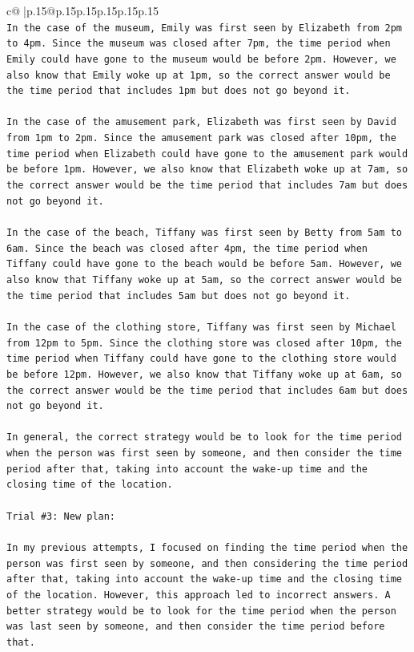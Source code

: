 \documentclass{article}
\begin{document}
{\begin{supertabular}{c@{$\;$}|p{.15\linewidth}@{}p{.15\linewidth}p{.15\linewidth}p{.15\linewidth}p{.15\linewidth}p{.15\linewidth}}
{{{\\ 
\texttt{In the case of the museum, Emily was first seen by Elizabeth from 2pm to 4pm. Since the museum was closed after 7pm, the time period when Emily could have gone to the museum would be before 2pm. However, we also know that Emily woke up at 1pm, so the correct answer would be the time period that includes 1pm but does not go beyond it.} \\
\\ 
\texttt{In the case of the amusement park, Elizabeth was first seen by David from 1pm to 2pm. Since the amusement park was closed after 10pm, the time period when Elizabeth could have gone to the amusement park would be before 1pm. However, we also know that Elizabeth woke up at 7am, so the correct answer would be the time period that includes 7am but does not go beyond it.} \\
\\ 
\texttt{In the case of the beach, Tiffany was first seen by Betty from 5am to 6am. Since the beach was closed after 4pm, the time period when Tiffany could have gone to the beach would be before 5am. However, we also know that Tiffany woke up at 5am, so the correct answer would be the time period that includes 5am but does not go beyond it.} \\
\\ 
\texttt{In the case of the clothing store, Tiffany was first seen by Michael from 12pm to 5pm. Since the clothing store was closed after 10pm, the time period when Tiffany could have gone to the clothing store would be before 12pm. However, we also know that Tiffany woke up at 6am, so the correct answer would be the time period that includes 6am but does not go beyond it.} \\
\\ 
\texttt{In general, the correct strategy would be to look for the time period when the person was first seen by someone, and then consider the time period after that, taking into account the wake{-}up time and the closing time of the location.} \\
\\ 
\texttt{Trial \#3: New plan: } \\
\\ 
\texttt{In my previous attempts, I focused on finding the time period when the person was first seen by someone, and then considering the time period after that, taking into account the wake{-}up time and the closing time of the location. However, this approach led to incorrect answers. A better strategy would be to look for the time period when the person was last seen by someone, and then consider the time period before that. } \\
}}}
\end{supertabular}}
\end{document}
